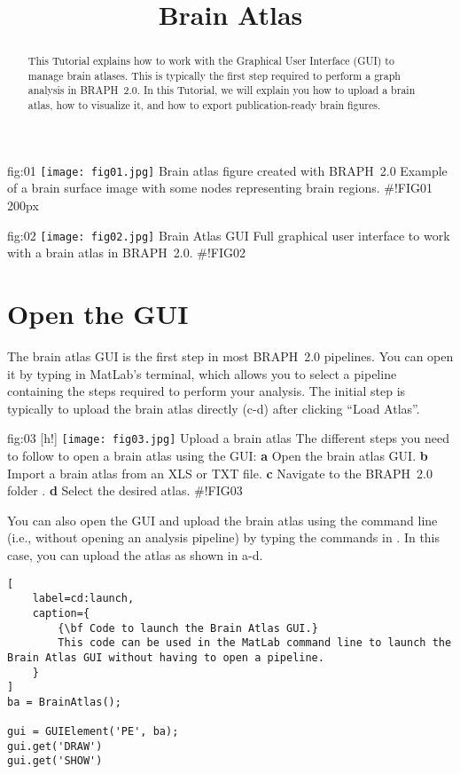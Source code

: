 \documentclass[justified]{tufte-handout}
\title{Brain Atlas}
\begin{document}
\maketitle
	
	{fig:01}
	{\texttt{[image: fig01.jpg]}}
	{Brain atlas figure created with BRAPH~2.0}
	{
	Example of a brain surface image with some nodes representing brain regions.
	}
#!FIG01 200px
\begin{abstract}
\noindent
This Tutorial explains how to work with the Graphical User Interface (GUI) to manage brain atlases.
This is typically the first step required to perform a graph analysis in BRAPH~2.0. 
In this Tutorial, we will explain you how to upload a brain atlas, how to visualize it, and how to export publication-ready brain figures.
\end{abstract}

\tableofcontents

	{fig:02}
	{\texttt{[image: fig02.jpg]}}
	{Brain Atlas GUI}
	{
	Full graphical user interface to work with a brain atlas in BRAPH~2.0. 
	}
#!FIG02
\clearpage
\section{Open the GUI}

The brain atlas GUI is the first step in most BRAPH~2.0 pipelines. You can open it by typing  in MatLab's terminal, which allows you to select a pipeline containing the steps required to perform your analysis. The initial step is typically to upload the brain atlas directly (c-d) after clicking ``Load Atlas''. 

	{fig:03}
	{
	[h!]
	\texttt{[image: fig03.jpg]}
	}
	{Upload a brain atlas}
	{
	The different steps you need to follow to open a brain atlas using the GUI: 
	{\bf a} Open the brain atlas GUI.
	{\bf b} Import a brain atlas from an XLS or TXT file.
	{\bf c} Navigate to the BRAPH~2.0 folder .
	{\bf d} Select the desired atlas.
	}
#!FIG03

\begin{tcolorbox}[
	title=Brain Atlas GUI launch from command line
]
You can also open the GUI and upload the brain atlas using the command line (i.e., without opening an analysis pipeline) by typing the commands in . In this case, you can upload the atlas as shown in a-d.

\begin{lstlisting}[
	label=cd:launch,
	caption={
		{\bf Code to launch the Brain Atlas GUI.}
		This code can be used in the MatLab command line to launch the  Brain Atlas GUI without having to open a pipeline.
	}
]
ba = BrainAtlas();

gui = GUIElement('PE', ba);
gui.get('DRAW')
gui.get('SHOW')
\end{lstlisting}
\end{tcolorbox}
\end{document}
